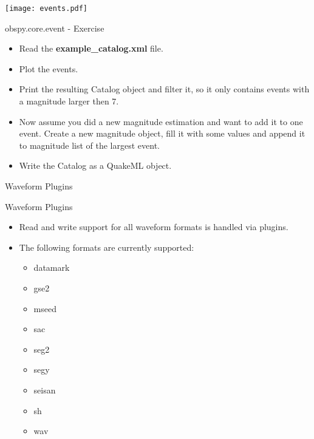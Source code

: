 \begin{frame}[plain]
\texttt{[image: events.pdf]}
\end{frame}

\begin{frame}{obspy.core.event - Exercise}
    \begin{itemize}
        \item Read the \textbf{example\_catalog.xml} file.
        \item Plot the events.
        \item Print the resulting Catalog object and filter it, so it only contains events with a magnitude larger then 7.
        \item Now assume you did a new magnitude estimation and want to add it
            to one event. Create a new magnitude object, fill it with some
            values and append it to magnitude list of the largest event.
        \item Write the Catalog as a QuakeML object.
    \end{itemize}
\end{frame}

\begin{frame}{}
    \begin{center}
        \textcolor{lmu@darkgreen}{\LARGE{Waveform Plugins}}
    \end{center}
\end{frame}


\begin{frame}{Waveform Plugins}
    \begin{itemize}
        \item Read and write support for all waveform formats is handled via plugins.
        \item The following formats are currently supported:
            \begin{itemize}
                \item datamark
                \item gse2
                \item mseed
                \item sac
                \item seg2
                \item segy
                \item seisan
                \item sh
                \item wav
            \end{itemize}
    \end{itemize}
\end{frame}



